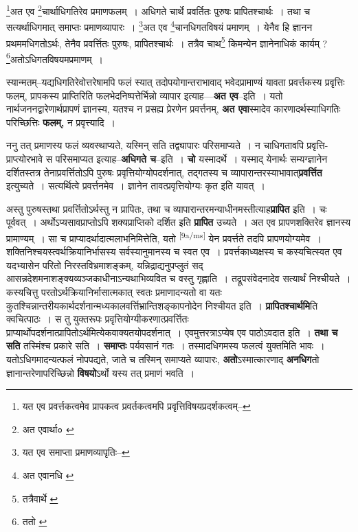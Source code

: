 \documentclass[article,12pt,a4paper]{memoir}
\begin{document}
	  \pstart \footnote{यत एव प्रवर्त्तकत्वमेव प्रापकत्व प्रवर्तकत्वमपि प्रवृत्तिविषयप्रदर्शकत्वम्--\cite{dp-msD-n}}अत एव \footnote{अत एवार्था० \cite{dp-msB}}चार्थाधिगतिरेव प्रमाणफलम् । अधिगते चार्थे प्रवर्तितः पुरुषः प्रापितश्चार्थः । तथा च सत्यर्थाधिगमात् समाप्तः प्रमाणव्यापारः । \footnote{यत एव समाप्ता प्रमाणव्यापृतिः--\cite{dp-msD-n}}अत एव \footnote{अत एवानधि \cite{dp-msA} \cite{dp-edP} \cite{dp-edH} \cite{dp-edE} \cite{dp-edN}}चानधिगतविषयं प्रमाणम् । येनैव हि ज्ञानन प्रथममधिगतोऽर्थः, तेनैव प्रवर्त्तितः पुरुषः, प्रापितश्चार्थः । तत्रैव चाथ\footnote{तत्रैवार्थे \cite{dp-msA} \cite{dp-edP} \cite{dp-edE} \cite{dp-edH} \cite{dp-edN}} किमन्येन ज्ञानेनाधिकं कार्यम् ? \footnote{ततो \cite{dp-msA} \cite{dp-msB} \cite{dp-msC} \cite{dp-msD} \cite{dp-edP} \cite{dp-edH} \cite{dp-edE} \cite{dp-edN}}अतोऽधिगतविषयमप्रमाणम् ।
	\pend
      

	  \pstart स्यान्मतम्--यद्यधिगतिरेवोत्तरेषामपि फलं स्यात् तदोपयोगान्तराभावाद् भवेदप्रामाण्यं यावता प्रवर्त्तकस्य प्रवृत्तिः फलम्, प्रापकस्य प्राप्तिरिति फलभेदनिष्पत्तेर्भिन्नो व्यापार इत्याह—\textbf{अत एव}--इति । यतो नार्थजननद्वारेणार्थप्रापणं ज्ञानस्य, यतश्च न प्रसह्य प्रेरणेन प्रवर्त्तनम्, \textbf{अत एवा}स्मादेव कारणादर्थस्याधिगतिः परिच्छित्तिः \textbf{फलम्,} न प्रवृत्त्यादि ।
	\pend
      

	  \pstart ननु तत् प्रमाणस्य फलं व्यवस्थाप्यते, यस्मिन् सति तद्व्यापारः परिसमाप्यते । न चाधिगतावपि प्रवृत्ति-प्राप्त्योरभावे स परिसमाप्यत इत्याह--\textbf{अधिगते च}--इति । \textbf{चो} यस्मादर्थे । यस्माद् येनार्थः सम्यग्ज्ञानेन दर्शितस्तत्र तेनाप्रवर्त्तितोऽपि पुरुषः प्रवृत्तियोग्योपदर्शनात्, तद्गतस्य च व्यापारान्तरस्याभावात्\textbf{प्रवर्त्तित} इत्युच्यते । सत्यर्थित्वे प्रवर्त्तनमेव । ज्ञानेन तावत्प्रवृत्तियोग्यः कृत इति यावत् ।
	\pend
      

	  \pstart अस्तु पुरुषस्तथा प्रवर्त्तितोऽर्थस्तु न प्रापितः, तथा च व्यापारान्तरमन्याधीनमस्तीत्याह\textbf{प्रापित} इति । चः पूर्ववत् । अर्थोऽप्यसावप्राप्तोऽपि शक्यप्राप्तिको दर्शित इति \textbf{प्रापित} उच्यते । अत एव प्रापणशक्तिरेव ज्ञानस्य प्रामाण्यम् । सा च प्राप्यादर्थादात्मलाभनिमित्तेति, यतो \leavevmode\textsuperscript{\rmlatinfont\tiny [9a/ms]} येन प्रवर्त्तते तदपि प्रापणयोग्यमेव । शक्तिनिश्चयस्त्वर्थक्रियानिर्भासस्य सर्वस्यानुमानस्य च स्वत एव । प्रवर्त्तकाध्यक्षस्य च कस्यचित्स्वत एव यदभ्यासेन परितो निरस्तविभ्रमाशङ्कम्, यन्निद्राद्यनुपप्लुतं सद् आसन्नदेशमनाशङ्क्यव्यञ्जकाधीनाऽन्यथाभिव्यवित च वस्तु गृह्णाति । तद्रूपसंवेदनादेव सत्यार्थं निश्चीयते । कस्यचित्तु परतोऽर्थक्रियानिर्भासात्मकात् स्वतः प्रमाणादन्यतो वा यतः कुतश्चिन्नान्तरीयकार्थदर्शनान्मध्यकालवर्त्तिभ्रान्तिशङ्कापनोदेन निश्चीयत इति । \textbf{प्रापितश्चार्थमि}ति क्वचित्पाठः । स तु युक्तरूपः प्रवृत्तियोग्यीकरणात्प्रवर्त्तितः प्राप्यार्थोपदर्शनात्प्रापितोऽर्थमित्येकवाक्यतयोपदर्शनात् । एवमुत्तरत्राऽप्येष एव पाठोऽवदात इति । \textbf{तथा च सति} तस्मिंश्च प्रकारे सति । \textbf{समाप्तः} पर्यवसानं गतः । तस्मादधिगमस्य फलत्वं युक्तमिति भावः । यतोऽधिगमादन्यत्फलं नोपपद्यते, जाते च तस्मिन् समाप्यते व्यापारः, \textbf{अतो}ऽस्मात्कारणाद् \textbf{अनधिग}तो ज्ञानान्तरेणापरिच्छिन्नो \textbf{विषयो}ऽर्थो यस्य तत् प्रमाणं भवति ।
	\pend
      
\end{document}
